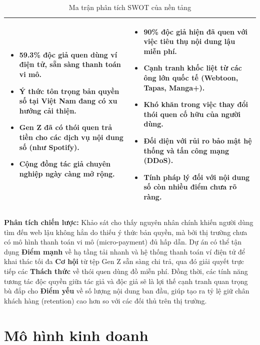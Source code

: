 \begin{table}[H]
\begin{tabular}{|>{\raggedright\arraybackslash}p{}|>{\raggedright\arraybackslash}p{}|}
\begin{itemize}
            \item 59.3\% độc giả quen dùng ví điện tử, sẵn sàng thanh toán vi mô.
            \item Ý thức tôn trọng bản quyền số tại Việt Nam đang có xu hướng cải thiện.
            \item Gen Z đã có thói quen trả tiền cho các dịch vụ nội dung số (như Spotify).
            \item Cộng đồng tác giả chuyên nghiệp ngày càng mở rộng.
        \end{itemize}
        & 
        \vspace{-0.3cm}
        \begin{itemize}
            \item 90\% độc giả hiện đã quen với việc tiêu thụ nội dung lậu miễn phí.
            \item Cạnh tranh khốc liệt từ các ông lớn quốc tế (Webtoon, Tapas, Manga+).
            \item Khó khăn trong việc thay đổi thói quen cố hữu của người dùng.
            \item Đối diện với rủi ro bảo mật hệ thống và tấn công mạng (DDoS).
            \item Tính pháp lý đối với nội dung số còn nhiều điểm chưa rõ ràng.
        \end{itemize} \\
        \hline
    \end{tabular}
    \caption{Ma trận phân tích SWOT của nền tảng}
    \label{tab:swot}
\end{table}

\textbf{Phân tích chiến lược:} Khảo sát cho thấy nguyên nhân chính khiến người dùng tìm đến web lậu không hẳn do thiếu ý thức bản quyền, mà bởi thị trường chưa có mô hình thanh toán vi mô (micro-payment) đủ hấp dẫn. Dự án có thể tận dụng \textbf{Điểm mạnh} về hạ tầng tải nhanh và hệ thống thanh toán ví điện tử để khai thác tối đa \textbf{Cơ hội} từ tệp Gen Z sẵn sàng chi trả, qua đó giải quyết trực tiếp các \textbf{Thách thức} về thói quen dùng đồ miễn phí. Đồng thời, các tính năng tương tác độc quyền giữa tác giả và độc giả sẽ là lợi thế cạnh tranh quan trọng bù đắp cho \textbf{Điểm yếu} về số lượng nội dung ban đầu, giúp tạo ra tỷ lệ giữ chân khách hàng (retention) cao hơn so với các đối thủ trên thị trường.

\section{Mô hình kinh doanh}

